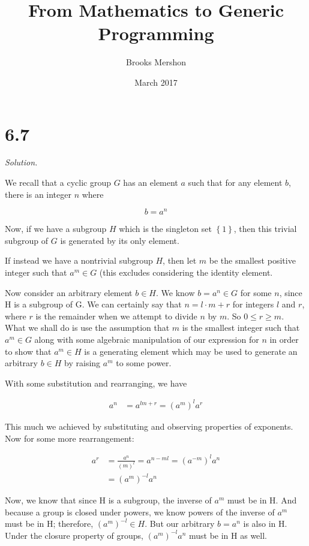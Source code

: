 \documentclass{article}
\title{From Mathematics to Generic Programming}
\author{Brooks Mershon}
\date{March 2017}
\begin{document}
\maketitle

\section*{6.7}

\textit{Solution.}

We recall that a cyclic group $G$ has an element $a$ such that for any element $b$, there is an integer $n$ where

$$b = a^n$$

Now, if we have a subgroup $H$ which is the singleton set $\left\{ 1 \right\}$, then this trivial subgroup of $G$ is generated by its only element.

If instead we have a nontrivial subgroup $H$, then let $m$ be the smallest positive integer such that $a^m \in G$ (this excludes considering the identity element.

Now consider an arbitrary element $b \in H$. We know $b = a^n \in G$ for some $n$, since H is a subgroup of G. We can certainly say that $n = l \cdot m + r$ for integers $l$ and $r$, where $r$ is the remainder when we attempt to divide $n$ by $m$. So $0 \leq r \geq m$. What we shall do is use the assumption that $m$ is the smallest integer such that $a^m \in G$ along with some algebraic manipulation of our expression for $n$ in order to show that $a^m \in H$ is a generating element which may be used to generate an arbitrary $b \in H$ by raising $a^m$ to some power.

With some substitution and rearranging, we have

\begin{align*}
    a^n &= a^{lm + r} = \left(a^m\right)^l a^r
\end{align*}

This much we achieved by substituting and observing properties of exponents. Now for some more rearrangement:


\begin{align*}
    a^r &= \frac{a^n}{\left( m \right)^l} = a^{n - ml} = \left(a^{-m}\right)^l a^n \\
        &=  \left(a^m \right)^{-l} a^n
\end{align*}

Now, we know that since H is a subgroup, the inverse of $a^m$ must be in H. And because a group is closed under powers, we know powers of the inverse of $a^m$ must be in H; therefore, $\left(a^m\right)^{-l} \in H$. But our arbitrary $b = a^n$ is also in H. Under the closure property of groups, $\left(a^m \right)^{-l} a^n$ must be in H as well.
\end{document}
